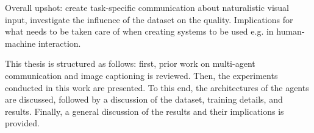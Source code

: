 Overall upshot: create task-specific communication about naturalistic visual input, investigate the influence of the dataset on the quality. Implications for what needs to be taken care of when creating systems to be used e.g. in human-machine interaction. 

This thesis is structured as follows: first, prior work on multi-agent communication and image captioning is reviewed. Then, the experiments conducted in this work are presented. To this end, the architectures of the agents are discussed, followed by a discussion of the dataset, training details, and results. Finally, a general discussion of the results and their implications is provided.
